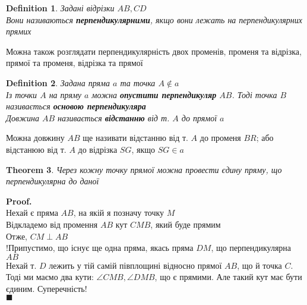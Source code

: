 \documentclass[a4paper, 14pt]{extarticle}
\theoremstyle{theoremdd}
\newtheorem{theorem}{Theorem}[subsection]
\theoremstyle{theoremdd}
\newtheorem{definition}[theorem]{Definition}
\theoremstyle{theoremdd}
\theoremstyle{theoremdd}
\theoremstyle{theoremdd}
\theoremstyle{theoremdd}
\theoremstyle{theoremdd}
\theoremstyle{theoremdd}
\newenvironment{pf}{\vspace*{-3mm} \textbf{Proof. \\}}{$\blacksquare$}
\begin{document}
\begin{definition} Задані відрізки $AB,CD$\\
Вони називаються \textbf{перпендикулярними}, якщо вони лежать на перпендикулярних прямих
\begin{figure}[H]
\centering
{}
\end{figure}
\end{definition}
Можна також розглядати перпендикулярність двох променів, променя та відрізка, прямої та променя, відрізка та прямої

\begin{definition}
Задана пряма $a$ та точка $A \not\in a$\\
Із точки $A$ на пряму $a$ можна \textbf{опустити перпендикуляр} $AB$. Тоді точка $B$ називається \textbf{основою перпендикуляра}\\
Довжина $AB$ називається \textbf{відстанню} від т. $A$ до прямої $a$
\begin{figure}[H]
\centering
{}
\end{figure}
\end{definition}
Можна довжину $AB$ ще називати відстанню від т. $A$ до променя $BR$; або відстанюю від т. $A$ до відрізка $SG$, якщо $SG \in a$

\begin{theorem}
Через кожну точку прямої можна провести єдину пряму, що перпендикулярна до даної
\end{theorem}

\begin{pf}
Нехай є пряма $AB$, на якій я позначу точку $M$\\
Відкладемо від промення $AB$ кут $CMB$, який буде прямим\\
Отже, $CM \perp AB$\\
!Припустимо, що існує ще одна пряма, якась пряма $DM$, що перпендикулярна $AB$\\
Нехай т. $D$ лежить у тій самій півплощині відносно прямої $AB$, що й точка $C$. Тоді ми маємо два кути: $\angle CMB, \angle DMB$, що є прямими. Але такий кут має бути єдиним. Суперечність!\\
\end{pf}
\newpage
\end{document}
